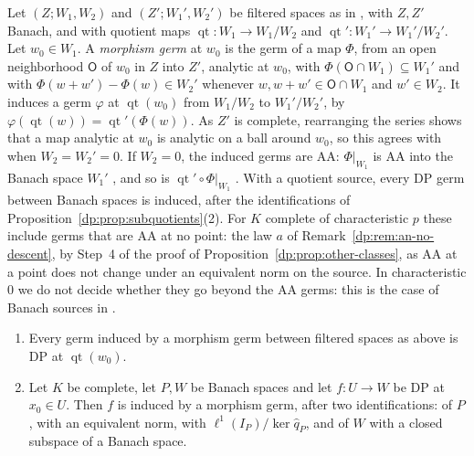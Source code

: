 Let $(Z;W_1,W_2)$ and $(Z';W_1',W_2')$ be filtered spaces as in \cite[Definition~14.1]{I}, with $Z,Z'$ Banach, and with quotient maps $\operatorname{qt}\colon W_1\to W_1/W_2$ and $\operatorname{qt}'\colon W_1'\to W_1'/W_2'$. Let $w_0\in W_1$. A \emph{morphism germ} at $w_0$ is the germ of a map $\Phi$, from an open neighborhood $\mathsf O$ of $w_0$ in $Z$ into $Z'$, analytic at $w_0$, with $\Phi(\mathsf O\cap W_1)\subseteq W_1'$ and with $\Phi(w+w')-\Phi(w)\in W_2'$ whenever $w,w+w'\in\mathsf O\cap W_1$ and $w'\in W_2$. It induces a germ $\varphi$ at $\operatorname{qt}(w_0)$ from $W_1/W_2$ to $W_1'/W_2'$, by $\varphi(\operatorname{qt}(w))=\operatorname{qt}'(\Phi(w))$. As $Z'$ is complete, rearranging the series shows that a map analytic at $w_0$ is analytic on a ball around $w_0$, so this agrees with \cite[Definition~14.25]{I} when $W_2=W_2'=0$. If $W_2=0$, the induced germs are AA: $\Phi|_{W_1}$ is AA into the Banach space $W_1'$ \cite[Remark~14.13]{I}, and so is $\operatorname{qt}'\circ\Phi|_{W_1}$ \cite[Proposition~14.12(1)]{I}. With a quotient source, every DP germ between Banach spaces is induced, after the identifications of Proposition~\ref{dp:prop:subquotients}(2). For $K$ complete of characteristic $p$ these include germs that are AA at no point: the law $a$ of Remark~\ref{dp:rem:an-no-descent}, by Step~4 of the proof of Proposition~\ref{dp:prop:other-classes}, as AA at a point does not change under an equivalent norm on the source. In characteristic $0$ we do not decide whether they go beyond the AA germs: this is the case of Banach sources in \cite[Question~14.42(1)]{I}.

\begin{proposition}\label{dp:prop:subquotients}
\leavevmode
\begin{enumerate}
\item Every germ induced by a morphism germ between filtered spaces as above is DP at $\operatorname{qt}(w_0)$.
\item Let $K$ be complete, let $P,W$ be Banach spaces and let $f\colon U\to W$ be DP at $x_0\in U$. Then $f$ is induced by a morphism germ, after two identifications: of $P$, with an equivalent norm, with $\ell^1(I_P)/\ker\hat q_P$, and of $W$ with a closed subspace of a Banach space.
\end{enumerate}
\end{proposition}

